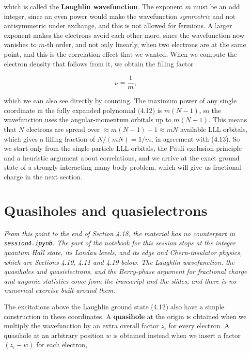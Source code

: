 which is called the \textbf{Laughlin wavefunction}. The exponent $m$ must be an odd integer, since
an even power would make the wavefunction \emph{symmetric} and not antisymmetric under exchange,
and this is not allowed for fermions. A larger exponent makes the electrons avoid each other more,
since the wavefunction now vanishes to $m$-th order, and not only linearly, when two electrons are
at the same point, and this is the correlation effect that we wanted. When we compute the electron
density that follows from it, we obtain the filling factor

\begin{equation}
\nu = \frac{1}{m},
\end{equation}

which we can also see directly by counting. The maximum power of any single coordinate in the
fully expanded polynomial (4.12) is $m(N-1)$, so the wavefunction uses the angular-momentum
orbitals up to $m(N-1)$. This means that $N$ electrons are spread over $\approx m(N-1)+1 \approx
mN$ available LLL orbitals, which gives a filling fraction of $N/(mN)=1/m$, in agreement with
(4.13). So we start only from the single-particle LLL
orbitals, the Pauli exclusion principle and a heuristic argument about correlations, and we arrive
at the exact ground state of a strongly interacting many-body problem, which will give us
fractional charge in the next section.

\section{Quasiholes and quasielectrons}

\emph{From this point to the end of Section 4.18, the material has no counterpart in
\texttt{session4.ipynb}. The part of the notebook for this session stops at the integer quantum
Hall state, its Landau levels, and its edge and Chern-insulator physics, which are Sections 4.10,
4.11 and 4.19 below. The Laughlin wavefunction, the quasiholes and quasielectrons, and the
Berry-phase argument for fractional charge and anyonic statistics come from the transcript and the
slides, and there is no numerical exercise built around them.}

The excitations above the Laughlin ground state (4.12) also have a simple construction in these
coordinates. A \textbf{quasihole} at the origin is obtained when we multiply the wavefunction by an
extra overall factor $z_i$ for every electron. A quasihole at an arbitrary position $w$ is obtained
instead when we insert a factor $(z_i-w)$ for each electron,

